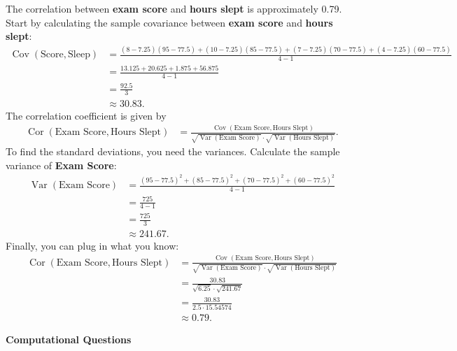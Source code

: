 \documentclass[11pt]{article}
\begin{document}
\begin{onehalfspacing}
\begin{enumerate}
\begin{enumerate}[label=(\alph*)]
\textcolor{PineGreen}{ The correlation between \textbf{exam score} and \textbf{hours slept} is approximately 0.79.
	Start by calculating the sample covariance between \textbf{exam score} and \textbf{hours slept}:
	\scriptsize
	\begin{align*}
	\mathop{\text{Cov}}(\text{Score}, \text{Sleep}) &= \frac{(8 - 7.25)(95 - 77.5) + (10 - 7.25)(85 - 77.5) + (7 - 7.25)(70 - 77.5) + (4 - 7.25)(60 - 77.5) }{4-1}
	\\ &= \frac{13.125 + 20.625 + 1.875 + 56.875}{4-1}
	\\ &= \frac{92.5}{3}
	\\ &\approx 30.83.
	\end{align*}	
	\normalsize	
	The correlation coefficient is given by
	\begin{align*}
	\mathop{\text{Cor}}(\text{Exam Score}, \text{Hours Slept}) &= \frac{\mathop{\text{Cov}}(\text{Exam Score}, \text{Hours Slept})}{\sqrt{\mathop{\text{Var}}(\text{Exam Score})} \cdot \sqrt{\mathop{\text{Var}}(\text{Hours Slept})}}.
	\end{align*}
	To find the standard deviations, you need the variances. 
	Calculate the sample variance of \textbf{Exam Score}:	
	\begin{align*}
	\mathop{\text{Var}}(\text{Exam Score}) &= \frac{(95 - 77.5)^2 + (85 - 77.5) ^2 + (70 - 77.5)^2 + (60 - 77.5)^2 }{4-1}
	\\ &= \frac{725}{4-1}
	\\ &= \frac{725}{3}
	\\ &\approx 241.67.
	\end{align*}	
	Finally, you can plug in what you know:	
	\begin{align*}
	\mathop{\text{Cor}}(\text{Exam Score}, \text{Hours Slept}) &= \frac{\mathop{\text{Cov}}(\text{Exam Score}, \text{Hours Slept})}{\sqrt{\mathop{\text{Var}}(\text{Exam Score})} \cdot \sqrt{\mathop{\text{Var}}(\text{Hours Slept})}}
	\\ &= \frac{30.83}{\sqrt{6.25} \cdot \sqrt{241.67}}
	\\ &= \frac{30.83}{2.5 \cdot 15.54574}
	\\ &\approx 0.79.
	\end{align*}	
	}
\end{enumerate}

\end{enumerate}

\newpage 

\begin{center}
\label{Computational}
\textbf{Computational Questions} \bigskip
\end{center}


\end{onehalfspacing}
\end{document}
